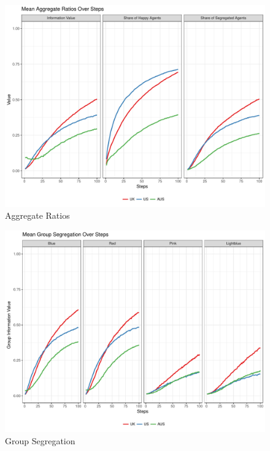 \documentclass[12pt, a4paper]{article}
\begin{document}
	\begin{figure}[bp!]
		\centering
		\caption{Aggregate Ratios}
		\includegraphics[scale=0.6]{./Plots/agg_ratios.pdf}
	\end{figure}
	
	\begin{figure}[bp!]
		\centering
		\caption{Group Segregation}
		\includegraphics[scale=0.6]{./Plots/grp_ratios.pdf}
	\end{figure}
	
\end{document}
